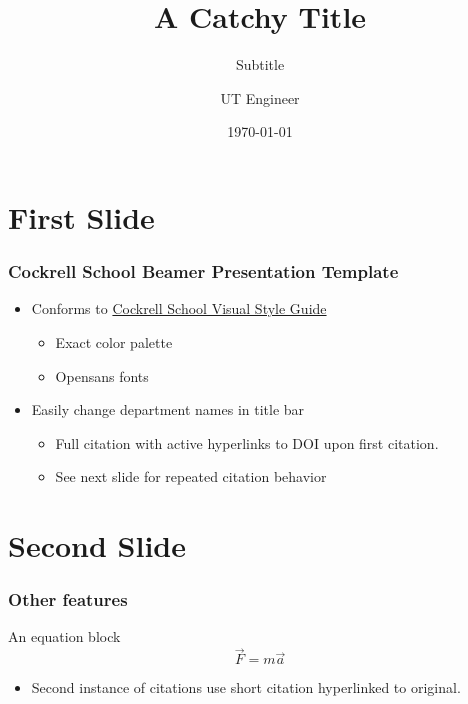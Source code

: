 \documentclass[t, pdftex]{beamer}
\title{A Catchy Title}
\subtitle{Subtitle}
\author{UT Engineer}
\institute{Special Event}
\date{\today}
\begin{document}
\titleframe


\section{First Slide}

\begin{frame}
    \frametitle{Cockrell School Beamer Presentation Template}

    \begin{itemize}
        \item Conforms to \href{http://www.engr.utexas.edu/communications/visualguidelines}{Cockrell School Visual Style Guide}
        \begin{itemize}
            \item Exact color palette
            \item Opensans fonts
        \end{itemize}
        \item Easily change department names in title bar
        \begin{itemize}
            \item Full citation with active hyperlinks to DOI upon first citation.
            \item See next slide for repeated citation behavior
        \end{itemize}
    \end{itemize}
\end{frame}

\section{Second Slide}
\begin{frame}[c]
    \frametitle{Other features}
    \begin{block}{An equation block}
        \[ \vec{F} = m \vec{a} \]
    \end{block}
    \begin{itemize}
        \item Second instance of citations use short citation hyperlinked to original.
    \end{itemize}
\end{frame}


\end{document}
